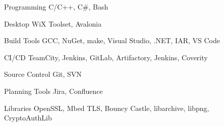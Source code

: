 

\begin{cvskills}


\cvskill
{Programming} %
{C/C++, C\#, Bash} %


\cvskill
{Desktop} %
{WiX Toolset, Avalonia} %


\cvskill
{Build Tools} %
{GCC, NuGet, make, Visual Studio, .NET, IAR, VS Code} %


\cvskill
{CI/CD} %
{TeamCity, Jenkins, GitLab, Artifactory, Jenkins, Coverity} %


\cvskill
{Source Control} %
{Git, SVN} %


\cvskill
{Planning Tools} %
{Jira, Confluence} %


\cvskill
{Libraries} %
{OpenSSL, Mbed TLS, Bouncy Castle, libarchive, libpng, CryptoAuthLib} %

\end{cvskills}